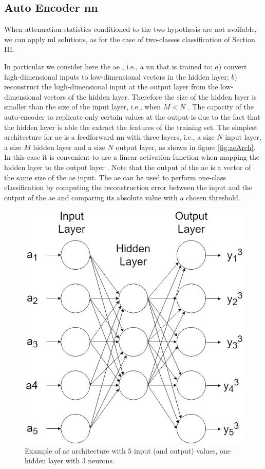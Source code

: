 \documentclass[draftcls,onecolumn,12pt]{IEEEtran}
\begin{document}
\subsection{Auto Encoder \ac{nn}}
\label{sec:auto}

When attenuation statistics conditioned to the two hypothesis are not available, we can apply \ac{ml} solutions, as for the case of two-classes classification of Section III. 

In particular we consider here the \ac{ae} \cite{Hinton-2006}, i.e., a \ac{nn} that is trained to: $a$) convert high-dimensional inputs to low-dimensional vectors in the hidden layer; $b$) reconstruct the high-dimensional input at the output layer from the low-dimensional vectors of the hidden layer. Therefore the size of the hidden layer is smaller than the size of the input layer, i.e., when $M<N$ \cite{Bourlard-88}. The capacity of the auto-encoder to replicate only certain values at the output is due to the fact that the hidden layer is able the extract the features of the training set. The simplest architecture for \ac{ae} is a feedforward \ac{nn} with three layers, i.e., a size $N$ input layer, a size $M$ hidden layer and a size $N$ output layer, as shown in figure \ref{fig:aeArch}. In this case it is convenient to use a linear activation function when mapping the hidden layer to the output layer \cite{goodfellow}. Note that the output of the \ac{ae} is a vector of the same size of the \ac{ae} input. The \ac{ae} can be used to perform one-class classification by computing the reconstruction error between the input and the output of the \ac{ae} and comparing its absolute value with a chosen threshold.

\begin{figure}[t]
    \centering
    \includegraphics[width=0.5\columnwidth]{AE.jpg}
    \caption{Example of \ac{ae} architecture with $5$ input (and output) values, one hidden layer with 3 neurons.} 
    \label{fig:mBS}
\end{figure}
\end{document}
